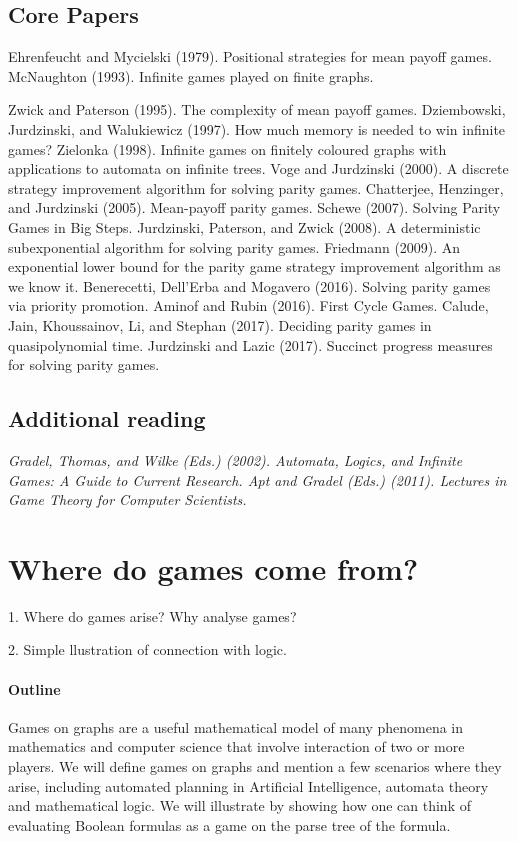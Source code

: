 \documentclass[a4paper,10pt]{article}
\begin{document}
\subsection{Core Papers}
\begin{itemize} 
 \- Ehrenfeucht and Mycielski (1979). Positional strategies for mean
  payoff games.
\- McNaughton (1993). Infinite games played on finite graphs.

\- Zwick and Paterson (1995). The complexity of mean payoff games.
\- Dziembowski, Jurdzinski, and Walukiewicz (1997). How much memory is
  needed to win infinite games?
\- Zielonka (1998). Infinite games on finitely coloured graphs with
  applications to automata on infinite trees.
\- Voge and Jurdzinski (2000). A discrete strategy improvement
  algorithm for solving parity games.
\- Chatterjee, Henzinger, and Jurdzinski (2005). Mean-payoff parity
  games.
\- Schewe (2007). Solving Parity Games in Big Steps.
\- Jurdzinski, Paterson, and Zwick (2008). A deterministic
  subexponential algorithm for solving parity games.
\- Friedmann (2009). An exponential lower bound for the parity game
  strategy improvement algorithm as we know it.
\- Benerecetti, Dell'Erba and Mogavero (2016). Solving parity games via
  priority promotion.
\- Aminof and Rubin (2016). First Cycle Games.
\- Calude, Jain, Khoussainov, Li, and Stephan (2017). Deciding parity
  games in quasipolynomial time.
\- Jurdzinski and Lazic (2017). Succinct progress measures for solving
  parity games.
\end{itemize}

\subsection{Additional reading}
\it
\- Gradel, Thomas, and Wilke (Eds.) (2002). Automata, Logics, and
  Infinite Games: A Guide to Current Research.
\- Apt and Gradel (Eds.) (2011). Lectures in Game Theory for Computer
  Scientists.
\ti

\section{Where do games come from?} 

1. Where do games arise? Why analyse games?

2. Simple llustration of connection with logic.

\paragraph{Outline}
Games on graphs are a useful mathematical model of many phenomena in mathematics and computer science that involve interaction of two or more players. We will define games on graphs and mention a few scenarios where they arise, including automated planning in Artificial Intelligence, automata theory and mathematical logic.
We will illustrate by showing how one can think of evaluating Boolean formulas as a game on the parse tree of the formula.
\end{document}
